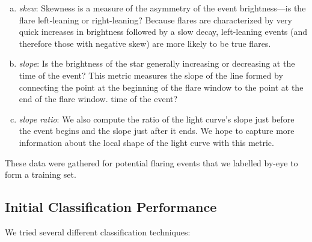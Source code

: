 \documentclass[11pt]{article}
\begin{document}
\begin{enumerate}[(a)]
\item \emph{skew}: Skewness is a measure of the asymmetry of the event
  brightness---is the flare left-leaning or right-leaning?  Because
  flares are characterized by very quick increases in brightness
  followed by a slow decay, left-leaning events (and therefore those
  with negative skew) are more likely to be true flares.
\item \emph{slope}: Is the brightness of the star generally increasing
  or decreasing at the time of the event?  This metric measures the
  slope of the line formed by connecting the point at the beginning of
  the flare window to the point at the end of the flare window.
  time of the event?
\item \emph{slope ratio}: We also compute the ratio of the light
  curve's slope just before the event begins and the slope just after
  it ends.  We hope to capture more information about the local shape
  of the light curve with this metric.
\end{enumerate}
These data were gathered for potential flaring events that we labelled
by-eye to form a training set.

\subsection{Initial Classification Performance}
\label{sec:class}
We tried several different classification techniques:
\end{document}
